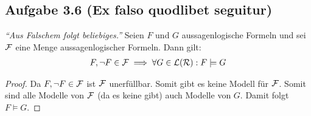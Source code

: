 \subsection{Aufgabe 3.6 (Ex falso quodlibet seguitur)}
\textit{``Aus Falschem folgt beliebiges.''}\nl
Seien $F$ und $G$ aussagenlogische Formeln und sei $\mathcal{F}$ eine Menge aussagenlogischer Formeln. 
Dann gilt:
\begin{align*}
	F,\neg F\in\mathcal{F}\implies\forall G\in\mathcal{L}(\mathcal{R}): F\models G
\end{align*}

\begin{proof}
	Da $F,\neg F\in\mathcal{F}$ ist $\mathcal{F}$ unerfüllbar. 
	Somit gibt es keine Modell für $\mathcal{F}$. 
	Somit sind alle Modelle von $\mathcal{F}$ (da es keine gibt) auch Modelle von $G$. 
	Damit folgt $F\models G$.
\end{proof}

